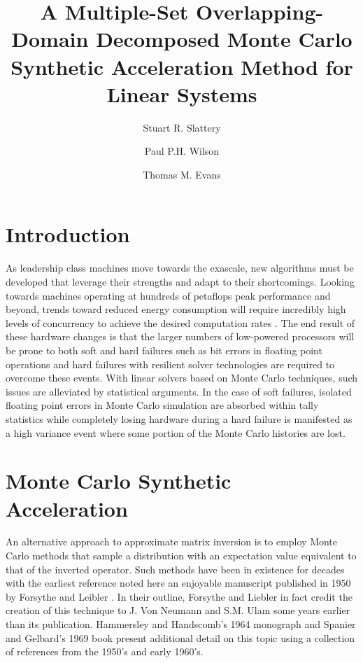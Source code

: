 \documentclass{snamc2013}
\title{A Multiple-Set Overlapping-Domain Decomposed Monte Carlo
  Synthetic Acceleration Method for Linear Systems}
\author[1]{Stuart R. Slattery}
\author[1]{Paul P.H. Wilson}
\author[2]{Thomas M. Evans}
\affil[1]{University of Wisconsin - Madison, Engineering Physics
  Department, 1500 Engineering Drive, Madison, WI 53706}
\affil[2]{Oak Ridge National Laboratory, One Bethel Valley Road, Oak
  Ridge, TN 37830}
\begin{document}
\section{Introduction}

As leadership class machines move towards the exascale, new algorithms
must be developed that leverage their strengths and adapt to their
shortcomings. Looking towards machines operating at hundreds of
petaflops peak performance and beyond, trends toward reduced energy
consumption will require incredibly high levels of concurrency to
achieve the desired computation rates \cite{kogge_using_2011}. The end
result of these hardware changes is that the larger numbers of
low-powered processors will be prone to both soft and hard failures
such as bit errors in floating point operations and hard failures with
resilient solver technologies are required to overcome these
events. With linear solvers based on Monte Carlo techniques, such
issues are alleviated by statistical arguments. In the case of soft
failures, isolated floating point errors in Monte Carlo simulation are
absorbed within tally statistics while completely losing hardware
during a hard failure is manifested as a high variance event where
some portion of the Monte Carlo histories are lost.

\section{Monte Carlo Synthetic Acceleration}

An alternative approach to approximate matrix inversion is to employ
Monte Carlo methods that sample a distribution with an expectation
value equivalent to that of the inverted operator. Such methods have
been in existence for decades with the earliest reference noted here
an enjoyable manuscript published in 1950 by Forsythe and Leibler
\cite{forsythe_matrix_1950}. In their outline, Forsythe and Liebler in
fact credit the creation of this technique to J. Von Neumann and
S.M. Ulam some years earlier than its publication. Hammersley and
Handscomb's 1964 monograph \cite{hammersley_monte_1964} and Spanier
and Gelbard's 1969 book \cite{spanier_monte_1969} present additional
detail on this topic using a collection of references from the 1950's
and early 1960's.
\end{document}
